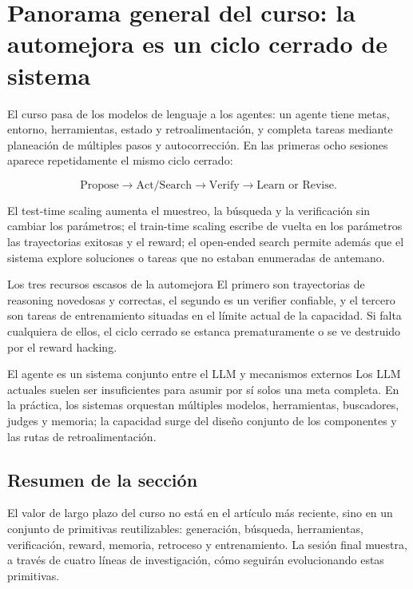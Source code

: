 \section{Panorama general del curso: la automejora es un ciclo cerrado de sistema}

El curso pasa de los modelos de lenguaje a los agentes: un agente tiene metas, entorno, herramientas, estado y retroalimentación, y completa tareas mediante planeación de múltiples pasos y autocorrección. En las primeras ocho sesiones aparece repetidamente el mismo ciclo cerrado:

$$
\text{Propose}\rightarrow \text{Act/Search}\rightarrow
\text{Verify}\rightarrow \text{Learn or Revise}.
$$

El test-time scaling aumenta el muestreo, la búsqueda y la verificación sin cambiar los parámetros; el train-time scaling escribe de vuelta en los parámetros las trayectorias exitosas y el reward; el open-ended search permite además que el sistema explore soluciones o tareas que no estaban enumeradas de antemano.



\begin{importantbox}{Los tres recursos escasos de la automejora}
El primero son trayectorias de reasoning novedosas y correctas, el segundo es un verifier confiable, y el tercero son tareas de entrenamiento situadas en el límite actual de la capacidad. Si falta cualquiera de ellos, el ciclo cerrado se estanca prematuramente o se ve destruido por el reward hacking.
\end{importantbox}

\begin{knowledgebox}{El agente es un sistema conjunto entre el LLM y mecanismos externos}
Los LLM actuales suelen ser insuficientes para asumir por sí solos una meta completa. En la práctica, los sistemas orquestan múltiples modelos, herramientas, buscadores, judges y memoria; la capacidad surge del diseño conjunto de los componentes y las rutas de retroalimentación.
\end{knowledgebox}

\subsection{Resumen de la sección}

El valor de largo plazo del curso no está en el artículo más reciente, sino en un conjunto de primitivas reutilizables: generación, búsqueda, herramientas, verificación, reward, memoria, retroceso y entrenamiento. La sesión final muestra, a través de cuatro líneas de investigación, cómo seguirán evolucionando estas primitivas.
